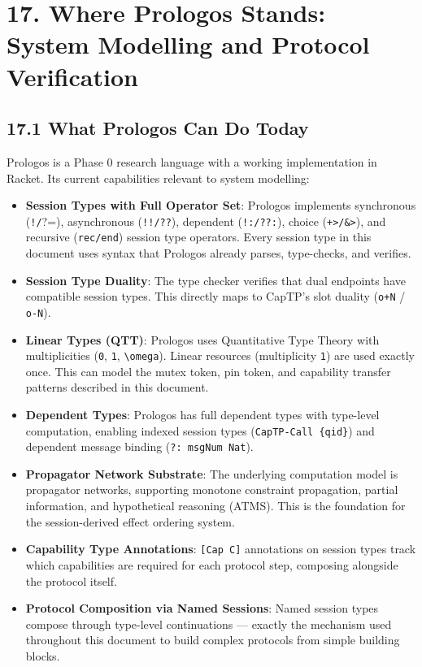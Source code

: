\documentclass[11pt]{article}
\begin{document}
\section{17. Where Prologos Stands: System Modelling and Protocol Verification}
\label{sec:orgb7f3033}

\subsection{17.1 What Prologos Can Do Today}
\label{sec:org6ea2862}

Prologos is a Phase 0 research language with a working implementation in
Racket. Its current capabilities relevant to system modelling:

\begin{itemize}
\item \textbf{Session Types with Full Operator Set}: Prologos implements synchronous
(\texttt{!/}?=), asynchronous (\texttt{!!/??}), dependent (\texttt{!:/??:}), choice (\texttt{+>/\&>}),
and recursive (\texttt{rec/end}) session type operators. Every session type in
this document uses syntax that Prologos already parses, type-checks, and
verifies.

\item \textbf{Session Type Duality}: The type checker verifies that dual endpoints have
compatible session types. This directly maps to CapTP's slot duality
(\texttt{o+N} / \texttt{o-N}).

\item \textbf{Linear Types (QTT)}: Prologos uses Quantitative Type Theory with
multiplicities (\texttt{0}, \texttt{1}, \texttt{\textbackslash{}omega}). Linear resources (multiplicity \texttt{1})
are used exactly once. This can model the mutex token, pin token, and
capability transfer patterns described in this document.

\item \textbf{Dependent Types}: Prologos has full dependent types with type-level
computation, enabling indexed session types (\texttt{CapTP-Call \{qid\}}) and
dependent message binding (\texttt{?: msgNum Nat}).

\item \textbf{Propagator Network Substrate}: The underlying computation model is
propagator networks, supporting monotone constraint propagation, partial
information, and hypothetical reasoning (ATMS). This is the foundation
for the session-derived effect ordering system.

\item \textbf{Capability Type Annotations}: \texttt{[Cap C]} annotations on session types
track which capabilities are required for each protocol step, composing
alongside the protocol itself.

\item \textbf{Protocol Composition via Named Sessions}: Named session types compose
through type-level continuations --- exactly the mechanism used throughout
this document to build complex protocols from simple building blocks.
\end{itemize}
\end{document}
